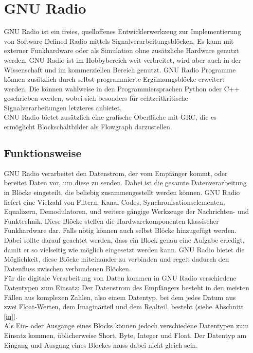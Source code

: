 \section{GNU Radio}
GNU Radio \cite{gnuradio} ist ein freies, quelloffenes Entwicklerwerkzeug zur Implementierung von Software Defined Radio mittels Signalverarbeitungsblöcken. Es kann mit externer Funkhardware oder als Simulation ohne zusätzliche Hardware genutzt werden. GNU Radio ist im Hobbybereich weit verbreitet, wird aber auch in der Wissenschaft und im kommerziellen Bereich genutzt. GNU Radio Programme können zusätzlich durch selbst programmierte Ergänzungsblöcke erweitert werden. Die können wahlweise in den Programmiersprachen Python oder C++ geschrieben werden, wobei sich besonders für echtzeitkritische Signalverarbeitungen letzteres anbietet.\\
GNU Radio bietet zusätzlich eine grafische Oberfläche mit \ac{GRC}, die es ermöglicht Blockschaltbilder als Flowgraph darzustellen.

\subsection{Funktionsweise}
GNU Radio verarbeitet den Datenstrom, der vom Empfänger kommt, oder bereitet Daten vor, um diese zu senden. Dabei ist die gesamte Datenverarbeitung in Blöcke eingeteilt, die  beliebig  zusammengestellt  werden können. GNU Radio liefert eine Vielzahl von Filtern, Kanal-Codes, Synchronisationselementen, Equalizern, Demodulatoren, und weitere gängige Werkzeuge der Nachrichten- und Funktechnik. Diese Blöcke stellen die Hardwarekomponenten klassischer Funkhardware dar. Falls nötig können auch selbst Blöcke hinzugefügt werden. Dabei sollte darauf geachtet werden, dass ein Block genau eine Aufgabe erledigt, damit er so vielseitig wie möglich eingesetzt werden kann. GNU Radio bietet die Möglichkeit, diese Blöcke miteinander zu verbinden und regelt dadurch den Datenfluss zwischen verbundenen Blöcken. \\

Für die digitale Verarbeitung von Daten kommen in GNU Radio verschiedene Datentypen zum Einsatz: Der Datenstrom des Empfängers besteht in den meisten Fällen aus komplexen Zahlen, also einem Datentyp, bei dem jedes Datum aus zwei Float-Werten, dem Imaginärteil und dem Realteil, besteht (siehe Abschnitt \ref{iq}). \\
Als Ein- oder Ausgänge eines Blocks können jedoch verschiedene Datentypen zum Einsatz kommen, üblicherweise Short, Byte, Integer und Float. Der Datentyp am Eingang und Ausgang eines Blockes muss dabei nicht gleich sein.\\

